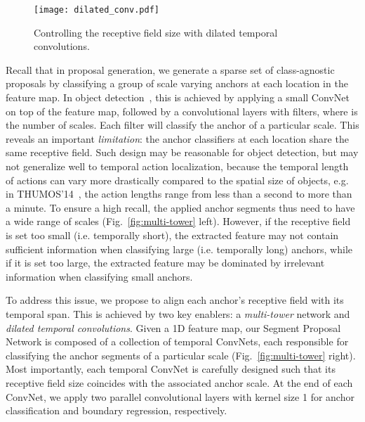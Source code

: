 \documentclass[10pt,twocolumn,letterpaper]{article}
\begin{document}
\begin{figure}[t]
\centering
 \texttt{[image: dilated\_conv.pdf]}
 \vspace{-1mm}
 \caption{\small Controlling the receptive field size  with dilated temporal
convolutions.}
 \vspace{-2mm}
 \label{fig:dilated_conv}
\end{figure}

Recall that in proposal generation, we generate a sparse set of class-agnostic
proposals by classifying a group of scale varying anchors at each location in
the feature map. In object detection~\cite{ren:nips2015}, this is achieved by
applying a small ConvNet on top of the feature map, followed by a 
convolutional layers with  filters, where  is the number of scales. Each
filter will classify the anchor of a particular scale. This reveals an
important \textit{limitation}: the anchor classifiers at each location share
the same receptive field. Such design may be reasonable for object detection,
but may not generalize well to temporal action localization, because the
temporal length of actions can vary more drastically compared to the spatial
size of objects, e.g. in THUMOS'14~\cite{THUMOS14}, the action lengths range
from less than a second to more than a minute. To ensure a high recall, the
applied anchor segments thus need to have a wide range of scales
(Fig.~\ref{fig:multi-tower} left). However, if the receptive field is set too
small (i.e. temporally short), the extracted feature may not contain sufficient
information when classifying large (i.e. temporally long) anchors, while if it
is set too large, the extracted feature may be dominated by irrelevant
information when classifying small anchors.



To address this issue, we propose to align each anchor's receptive field with
its temporal span. This is achieved by two key enablers: a \textit{multi-tower}
network and \textit{dilated temporal convolutions}. Given a 1D feature map, our
Segment Proposal Network is composed of a collection of  temporal ConvNets,
each responsible for classifying the anchor segments of a particular scale
(Fig.~\ref{fig:multi-tower} right). Most importantly, each temporal ConvNet is
carefully designed such that its receptive field size coincides with the
associated anchor scale. At the end of each ConvNet, we apply two parallel
convolutional layers with kernel size 1 for anchor classification and boundary
regression, respectively.
\end{document}
